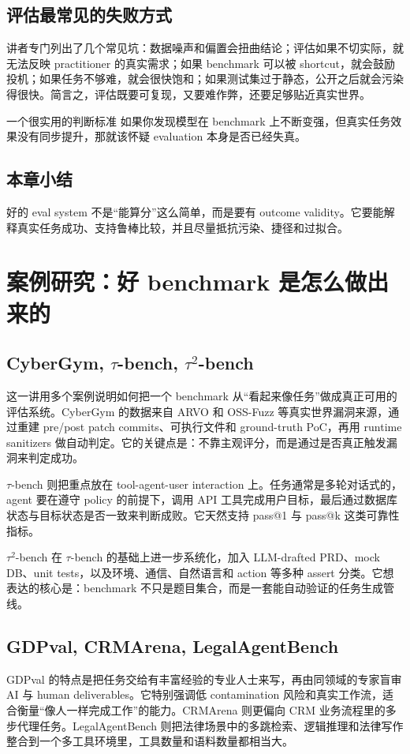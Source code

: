 \documentclass[a4paper]{article}
\begin{document}
\subsection{评估最常见的失败方式}
讲者专门列出了几个常见坑：数据噪声和偏置会扭曲结论；评估如果不切实际，就无法反映 practitioner 的真实需求；如果 benchmark 可以被 shortcut，就会鼓励投机；如果任务不够难，就会很快饱和；如果测试集过于静态，公开之后就会污染得很快。简言之，评估既要可复现，又要难作弊，还要足够贴近真实世界。

\begin{warningbox}{一个很实用的判断标准}
如果你发现模型在 benchmark 上不断变强，但真实任务效果没有同步提升，那就该怀疑 evaluation 本身是否已经失真。
\end{warningbox}

\subsection{本章小结}
好的 eval system 不是“能算分”这么简单，而是要有 outcome validity。它要能解释真实任务成功、支持鲁棒比较，并且尽量抵抗污染、捷径和过拟合。

\section{案例研究：好 benchmark 是怎么做出来的}
\subsection{CyberGym, \texorpdfstring{$\tau$}{tau}-bench, \texorpdfstring{$\tau^2$}{tau2}-bench}
这一讲用多个案例说明如何把一个 benchmark 从“看起来像任务”做成真正可用的评估系统。CyberGym 的数据来自 ARVO 和 OSS-Fuzz 等真实世界漏洞来源，通过重建 pre/post patch commits、可执行文件和 ground-truth PoC，再用 runtime sanitizers 做自动判定。它的关键点是：不靠主观评分，而是通过是否真正触发漏洞来判定成功。

\(\tau\)-bench 则把重点放在 tool-agent-user interaction 上。任务通常是多轮对话式的，agent 要在遵守 policy 的前提下，调用 API 工具完成用户目标，最后通过数据库状态与目标状态是否一致来判断成败。它天然支持 pass@1 与 pass@k 这类可靠性指标。

\(\tau^2\)-bench 在 \(\tau\)-bench 的基础上进一步系统化，加入 LLM-drafted PRD、mock DB、unit tests，以及环境、通信、自然语言和 action 等多种 assert 分类。它想表达的核心是：benchmark 不只是题目集合，而是一套能自动验证的任务生成管线。

\subsection{GDPval, CRMArena, LegalAgentBench}
GDPval 的特点是把任务交给有丰富经验的专业人士来写，再由同领域的专家盲审 AI 与 human deliverables。它特别强调低 contamination 风险和真实工作流，适合衡量“像人一样完成工作”的能力。CRMArena 则更偏向 CRM 业务流程里的多步代理任务。LegalAgentBench 则把法律场景中的多跳检索、逻辑推理和法律写作整合到一个多工具环境里，工具数量和语料数量都相当大。
\end{document}

